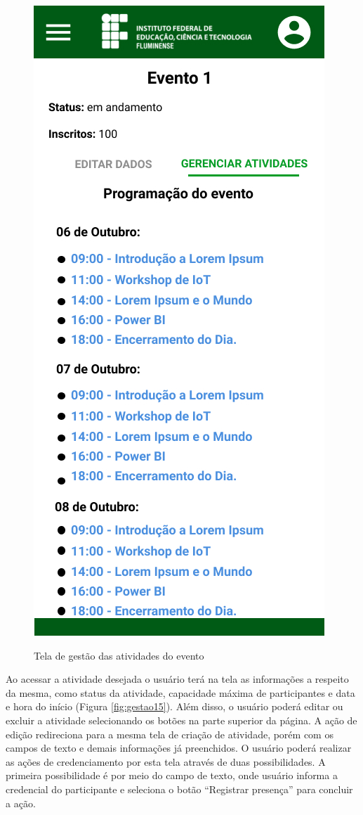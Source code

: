 \begin{figure}[H]
    \centering
    \caption{Tela de gestão das atividades do evento}
    \includegraphics[scale=0.44]{figuras/Gestao/14-GerenciarAtividades.jpg}
    \label{fig:gestao14}
\end{figure}

Ao acessar a atividade desejada o usuário terá na tela as informações a respeito da mesma, como status da atividade, capacidade máxima de participantes e data e hora do início (Figura \ref{fig:gestao15}). Além disso, o usuário poderá editar ou excluir a atividade selecionando os botões na parte superior da página. A ação de edição redireciona para a mesma tela de criação de atividade, porém com os campos de texto e demais informações já preenchidos. O usuário poderá realizar as ações de credenciamento por esta tela através de duas possibilidades. A primeira possibilidade é por meio do campo de texto, onde usuário informa a credencial do participante e seleciona o botão “Registrar presença” para concluir a ação.

